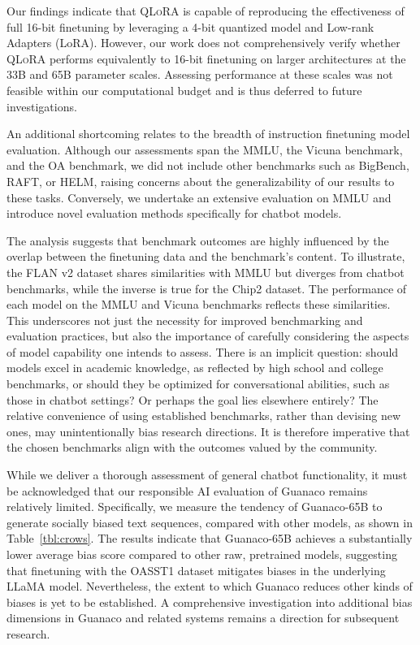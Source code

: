 Our findings indicate that \textsc{QLoRA} is capable of reproducing the effectiveness of full 16-bit finetuning by leveraging a 4-bit quantized model and Low-rank Adapters (LoRA). However, our work does not comprehensively verify whether \textsc{QLoRA} performs equivalently to 16-bit finetuning on larger architectures at the 33B and 65B parameter scales. Assessing performance at these scales was not feasible within our computational budget and is thus deferred to future investigations.

An additional shortcoming relates to the breadth of instruction finetuning model evaluation. Although our assessments span the MMLU, the Vicuna benchmark, and the OA benchmark, we did not include other benchmarks such as BigBench, RAFT, or HELM, raising concerns about the generalizability of our results to these tasks. Conversely, we undertake an extensive evaluation on MMLU and introduce novel evaluation methods specifically for chatbot models.

The analysis suggests that benchmark outcomes are highly influenced by the overlap between the finetuning data and the benchmark’s content. To illustrate, the FLAN v2 dataset shares similarities with MMLU but diverges from chatbot benchmarks, while the inverse is true for the Chip2 dataset. The performance of each model on the MMLU and Vicuna benchmarks reflects these similarities. This underscores not just the necessity for improved benchmarking and evaluation practices, but also the importance of carefully considering the aspects of model capability one intends to assess. There is an implicit question: should models excel in academic knowledge, as reflected by high school and college benchmarks, or should they be optimized for conversational abilities, such as those in chatbot settings? Or perhaps the goal lies elsewhere entirely? The relative convenience of using established benchmarks, rather than devising new ones, may unintentionally bias research directions. It is therefore imperative that the chosen benchmarks align with the outcomes valued by the community.

While we deliver a thorough assessment of general chatbot functionality, it must be acknowledged that our responsible AI evaluation of {Guanaco} remains relatively limited. Specifically, we measure the tendency of {Guanaco}-65B to generate socially biased text sequences, compared with other models, as shown in Table~\ref{tbl:crows}. The results indicate that {Guanaco}-65B achieves a substantially lower average bias score compared to other raw, pretrained models, suggesting that finetuning with the OASST1 dataset mitigates biases in the underlying LLaMA model. Nevertheless, the extent to which {Guanaco} reduces other kinds of biases is yet to be established. A comprehensive investigation into additional bias dimensions in {Guanaco} and related systems remains a direction for subsequent research.

